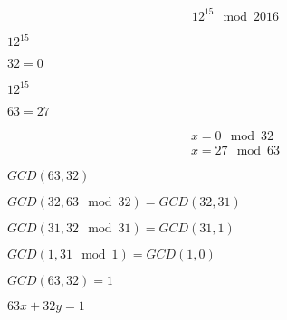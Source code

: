 \documentclass[10pt]{book}
\begin{document}
\begin{mdSnippets}
\begin{mdDisplaySnippet}[31e8e23334284b964dcac3c3373c273f]
\[%
12^{15} \mod 2016
\]%
\end{mdDisplaySnippet}%
\begin{mdInlineSnippet}[98c4c1c740f0f955ab13277c4891a4e4]%
$12^{15}$\end{mdInlineSnippet}%
\begin{mdInlineSnippet}[d9f754df6617df6275dc3b64afd729f8]%
$32 = 0$\end{mdInlineSnippet}%
\begin{mdInlineSnippet}[98c4c1c740f0f955ab13277c4891a4e4]%
$12^{15}$\end{mdInlineSnippet}%
\begin{mdInlineSnippet}%
$63 = 27$\end{mdInlineSnippet}%
\begin{mdDisplaySnippet}%
\[%
{\begin{array}{l}
x = 0 \mod 32\\
x = 27 \mod 63
\end{array}}
\]%
\end{mdDisplaySnippet}%
\begin{mdInlineSnippet}[a0b91889e483108c49e24821ce327d76]%
$GCD(63, 32)$\end{mdInlineSnippet}%
\begin{mdInlineSnippet}%
$GCD(32, 63 \mod 32) = GCD(32, 31)$\end{mdInlineSnippet}%
\begin{mdInlineSnippet}[8ab837dd38927f4bdd2cf9af4d96d5b2]%
$GCD(31, 32 \mod 31) = GCD(31, 1)$\end{mdInlineSnippet}%
\begin{mdInlineSnippet}[d6b6b957b6ade0aa0d7db0c2c5063bb9]%
$GCD(1, 31 \mod 1) = GCD(1, 0)$\end{mdInlineSnippet}%
\begin{mdInlineSnippet}[ee613f5a19c0b74b8513c38ee4401556]%
$GCD(63,32) = 1$\end{mdInlineSnippet}%
\begin{mdInlineSnippet}[6de8cdb29d07ba7dd5d26a963e1870d6]%
$63x + 32y = 1$\end{mdInlineSnippet}%
\begin{mdInlineSnippet}[7c477670495296c99a5898d116e275fc]%

\end{mdInlineSnippet}
\end{mdSnippets}
\end{document}
